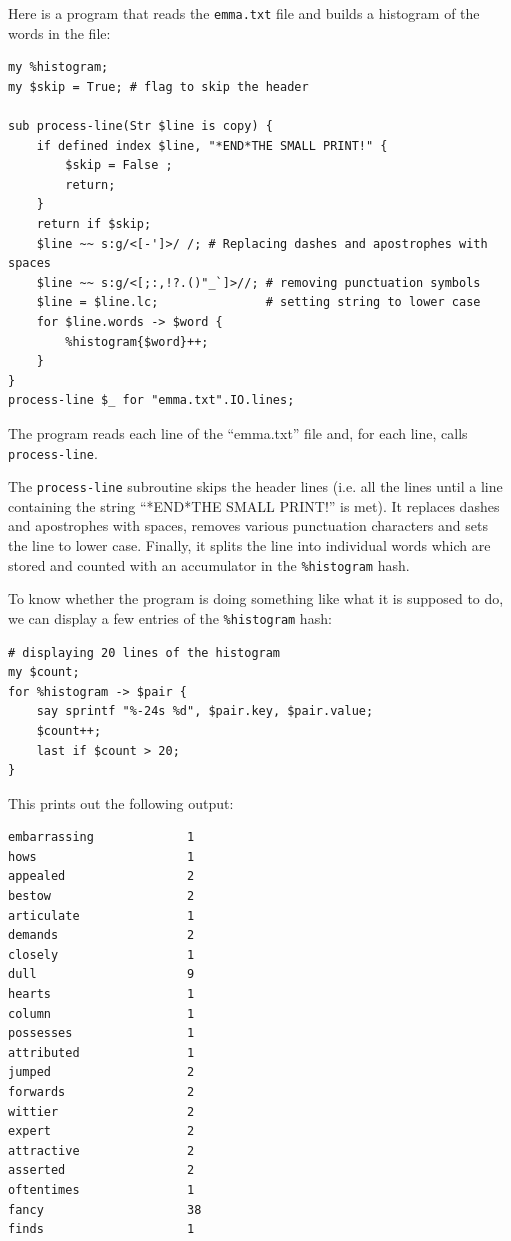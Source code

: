 Here is a program that reads the \verb'emma.txt' file and 
builds a histogram of the words in the file:

\begin{verbatim}
my %histogram;
my $skip = True; # flag to skip the header

sub process-line(Str $line is copy) {
    if defined index $line, "*END*THE SMALL PRINT!" {
        $skip = False ;
        return;
    }
    return if $skip;
    $line ~~ s:g/<[-']>/ /; # Replacing dashes and apostrophes with spaces
    $line ~~ s:g/<[;:,!?.()"_`]>//; # removing punctuation symbols
    $line = $line.lc;               # setting string to lower case
    for $line.words -> $word {
        %histogram{$word}++;
    }
}
process-line $_ for "emma.txt".IO.lines; 
\end{verbatim}
%

The program reads each line of the ``emma.txt'' file and, for 
each line, calls \verb"process-line". 

The \verb"process-line" subroutine skips the header lines 
(i.e. all the lines until a line containing the string
``*END*THE SMALL PRINT!'' 
is met). It replaces dashes and apostrophes with spaces, removes 
various punctuation characters and sets the line to lower case. 
Finally, it splits the line into individual words which are 
stored and counted with an accumulator in the \verb'%histogram' 
hash.

To know whether the program is doing something like what 
it is supposed to do, we can display a few entries of the 
\verb'%histogram' hash:

\begin{verbatim}
# displaying 20 lines of the histogram
my $count;
for %histogram -> $pair {
    say sprintf "%-24s %d", $pair.key, $pair.value;
    $count++;
    last if $count > 20;
}
\end{verbatim}

This prints out the following output:

\begin{verbatim}
embarrassing             1
hows                     1
appealed                 2
bestow                   2
articulate               1
demands                  2
closely                  1
dull                     9
hearts                   1
column                   1
possesses                1
attributed               1
jumped                   2
forwards                 2
wittier                  2
expert                   2
attractive               2
asserted                 2
oftentimes               1
fancy                    38
finds                    1
\end{verbatim}


